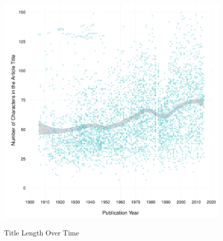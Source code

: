 \documentclass[12pt]{article}
\begin{document}
\begin{figure}[htbp]
\centering
\caption{Title Length Over Time}
\includegraphics[scale=.85]{../figs/title_len_over_time.pdf}
\label{fig:fulltext}
\end{figure}

\clearpage


\end{document}
